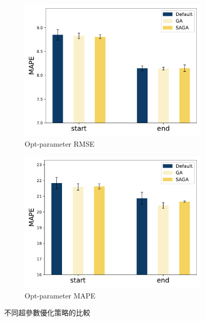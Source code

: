 \documentclass[a4paper,12pt]{extarticle}
\begin{document}
                \begin{figure}[htb]
                    \centering
                    \begin{subfigure}{.5\columnwidth}
                        \centering
                        \includegraphics[width=\linewidth]{opt_RMSE.pdf}
                        \caption{
                            Opt-parameter RMSE
                        }
                    \end{subfigure}%
                    \hfill
                    \begin{subfigure}{.5\columnwidth}
                        \centering
                        \includegraphics[width=\linewidth]{opt_MAPE.pdf}
                        \caption{ 
                            Opt-parameter MAPE
                        }
                    \end{subfigure}%
                    \caption{
                        不同超參數優化策略的比較
                    }
                    \label{fig:opt_comparison}
                \end{figure}
\end{document}
